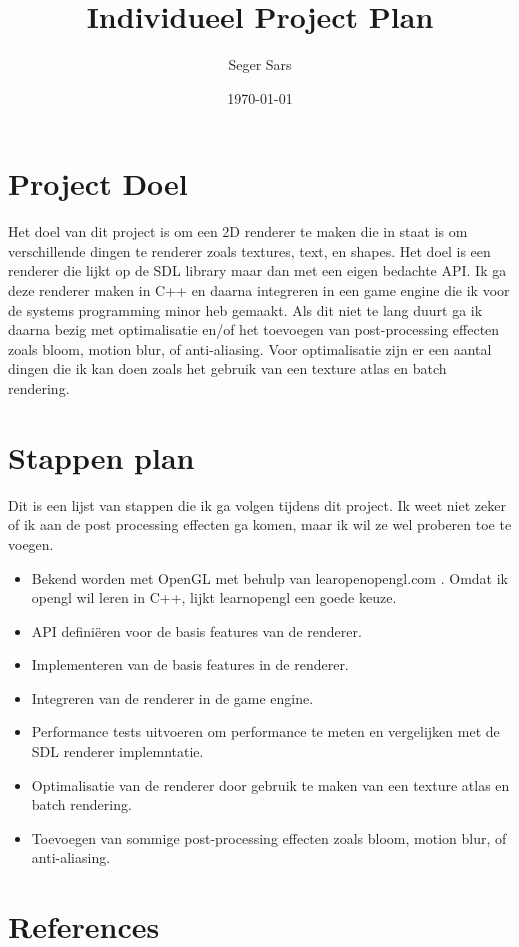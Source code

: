\documentclass{article}
\begin{document}
\title{Individueel Project Plan}
\author{Seger Sars}
\date{\today}
\maketitle

\section{Project Doel}
Het doel van dit project is om een 2D renderer te maken die in staat is om verschillende dingen te renderer zoals textures, text, en shapes. 
Het doel is een renderer die lijkt op de SDL \cite{sdl} library maar dan met een eigen bedachte API.
Ik ga deze renderer maken in C++ en daarna integreren in een game engine die ik voor de systems programming minor heb gemaakt.
Als dit niet te lang duurt ga ik daarna bezig met optimalisatie en/of het toevoegen van post-processing effecten zoals bloom, motion blur, of anti-aliasing.
Voor optimalisatie zijn er een aantal dingen die ik kan doen zoals het gebruik van een texture atlas en batch rendering.

\section{Stappen plan}
Dit is een lijst van stappen die ik ga volgen tijdens dit project. 
Ik weet niet zeker of ik aan de post processing effecten ga komen, maar ik wil ze wel proberen toe te voegen.
\begin{itemize}
    \item Bekend worden met OpenGL met behulp van learopenopengl.com \cite{learnopengl}. Omdat ik opengl wil leren in C++, lijkt learnopengl een goede keuze.
    \item API definiëren voor de basis features van de renderer.
    \item Implementeren van de basis features in de renderer.
    \item Integreren van de renderer in de game engine.
    \item Performance tests uitvoeren om performance te meten en vergelijken met de SDL renderer implemntatie.
    \item Optimalisatie van de renderer door gebruik te maken van een texture atlas en batch rendering.
    \item Toevoegen van sommige post-processing effecten zoals bloom, motion blur, of anti-aliasing.
\end{itemize}

\newpage

\section{References}
\printbibliography
\end{document}
